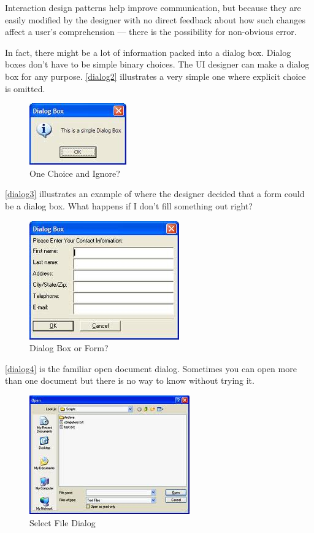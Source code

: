 Interaction design patterns help improve communication, but because they are easily modified by the designer with no direct feedback about how such changes affect a user's comprehension --- there is the possibility for non-obvious error. 

In fact, there might be a lot of information packed into a dialog box. Dialog boxes don't have to be simple binary choices. The UI designer can make a dialog box for any purpose.  \autoref{dialog2}  illustrates a very simple one where explicit choice is omitted. 


\begin{figure}
\centerline{
\includegraphics[scale=.5]{chapter8.tex/dialog2}
}
\caption{One Choice and Ignore?}
\label{dialog2}
\end{figure}


 \autoref{dialog3}  illustrates an example of where the designer decided that a form could be a dialog box. What happens if I don't fill something out right?


\begin{figure}
\centerline{
\includegraphics[scale=.5]{chapter8.tex/dialog3}
}
\caption{Dialog Box or Form?}
\label{dialog3}
\end{figure}


 \autoref{dialog4}  is the familiar open document dialog. Sometimes you can open more than one document but there is no way to know without trying it.


\begin{figure}
\centerline{
\includegraphics[scale=.5]{chapter8.tex/dialog4}
}
\caption{Select File Dialog}
\label{dialog4}
\end{figure}


